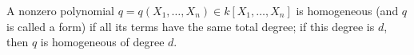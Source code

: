 A nonzero polynomial $q = q(X_1, \ldots, X_n) \in k[X_1, \ldots, X_n]$ is homogeneous (and $q$ is called a form) if all its terms have the same total degree; if this degree is $d$, then $q$ is homogeneous of degree $d$.
